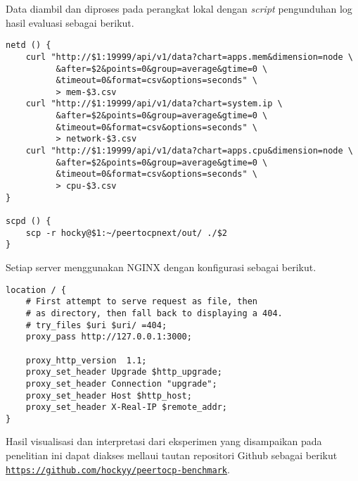 Data diambil dan diproses pada perangkat lokal dengan \textit{script} pengunduhan log hasil evaluasi sebagai berikut.

\begin{verbatim}
netd () {
    curl "http://$1:19999/api/v1/data?chart=apps.mem&dimension=node \
          &after=$2&points=0&group=average&gtime=0 \
          &timeout=0&format=csv&options=seconds" \
          > mem-$3.csv
    curl "http://$1:19999/api/v1/data?chart=system.ip \
          &after=$2&points=0&group=average&gtime=0 \
          &timeout=0&format=csv&options=seconds" \
          > network-$3.csv
    curl "http://$1:19999/api/v1/data?chart=apps.cpu&dimension=node \
          &after=$2&points=0&group=average&gtime=0 \
          &timeout=0&format=csv&options=seconds" \
          > cpu-$3.csv
}

scpd () {
    scp -r hocky@$1:~/peertocpnext/out/ ./$2
}
\end{verbatim}

Setiap server menggunakan NGINX dengan konfigurasi sebagai berikut.

\begin{verbatim}
location / {
    # First attempt to serve request as file, then
    # as directory, then fall back to displaying a 404.
    # try_files $uri $uri/ =404;
    proxy_pass http://127.0.0.1:3000;

    proxy_http_version  1.1;
    proxy_set_header Upgrade $http_upgrade;
    proxy_set_header Connection "upgrade";
    proxy_set_header Host $http_host;
    proxy_set_header X-Real-IP $remote_addr;
}
\end{verbatim}

Hasil visualisasi dan interpretasi dari eksperimen yang disampaikan pada penelitian ini dapat diakses mellaui tautan repositori Github sebagai berikut \texttt{\url{https://github.com/hockyy/peertocp-benchmark}}.